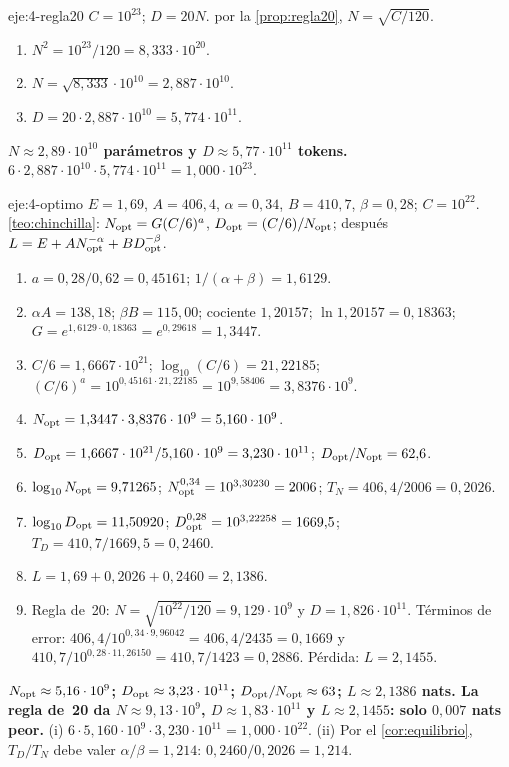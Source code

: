 \begin{solucion}{eje:4-regla20}
\datos $C=10^{23}$; $D=20N$.
\planteamiento por la \cref{prop:regla20}, $N=\sqrt{C/120}$.
\pasos
\begin{enumerate}[label=\arabic*.]
  \item $N^{2}=10^{23}/120=8{,}333\cdot 10^{20}$.
  \item $N=\sqrt{8{,}333}\cdot 10^{10}=2{,}887\cdot 10^{10}$.
  \item $D=20\cdot 2{,}887\cdot 10^{10}=5{,}774\cdot 10^{11}$.
\end{enumerate}
\resultado \textbf{$N\approx 2{,}89\cdot 10^{10}$ parámetros y $D\approx 5{,}77\cdot 10^{11}$ tokens.}
\comprobacion $6\cdot 2{,}887\cdot 10^{10}\cdot 5{,}774\cdot 10^{11}=1{,}000\cdot 10^{23}$.
\end{solucion}

\begin{solucion}{eje:4-optimo}
\datos $E=1{,}69$, $A=406{,}4$, $\alpha=0{,}34$, $B=410{,}7$, $\beta=0{,}28$; $C=10^{22}$.
\planteamiento \cref{teo:chinchilla}: $N_{\mathrm{opt}}=G(C/6)^{a}$, $D_{\mathrm{opt}}=(C/6)/N_{\mathrm{opt}}$; después $L=E+AN_{\mathrm{opt}}^{-\alpha}+BD_{\mathrm{opt}}^{-\beta}$.
\pasos
\begin{enumerate}[label=\arabic*.]
  \item $a=0{,}28/0{,}62=0{,}45161$; $1/(\alpha+\beta)=1{,}6129$.
  \item $\alpha A=138{,}18$; $\beta B=115{,}00$; cociente $1{,}20157$; $\ln 1{,}20157=0{,}18363$; $G=e^{1{,}6129\cdot 0{,}18363}=e^{0{,}29618}=1{,}3447$.
  \item $C/6=1{,}6667\cdot 10^{21}$; $\log_{10}(C/6)=21{,}22185$; $(C/6)^{a}=10^{0{,}45161\cdot 21{,}22185}=10^{9{,}58406}=3{,}8376\cdot 10^{9}$.
  \item $N_{\mathrm{opt}}=1{,}3447\cdot 3{,}8376\cdot 10^{9}=5{,}160\cdot 10^{9}$.
  \item $D_{\mathrm{opt}}=1{,}6667\cdot 10^{21}/5{,}160\cdot 10^{9}=3{,}230\cdot 10^{11}$; $D_{\mathrm{opt}}/N_{\mathrm{opt}}=62{,}6$.
  \item $\log_{10}N_{\mathrm{opt}}=9{,}71265$; $N_{\mathrm{opt}}^{0{,}34}=10^{3{,}30230}=2006$; $T_N=406{,}4/2006=0{,}2026$.
  \item $\log_{10}D_{\mathrm{opt}}=11{,}50920$; $D_{\mathrm{opt}}^{0{,}28}=10^{3{,}22258}=1669{,}5$; $T_D=410{,}7/1669{,}5=0{,}2460$.
  \item $L=1{,}69+0{,}2026+0{,}2460=2{,}1386$.
  \item Regla de~20: $N=\sqrt{10^{22}/120}=9{,}129\cdot 10^{9}$ y $D=1{,}826\cdot 10^{11}$. Términos de error: $406{,}4/10^{0{,}34\cdot 9{,}96042}=406{,}4/2435=0{,}1669$ y $410{,}7/10^{0{,}28\cdot 11{,}26150}=410{,}7/1423=0{,}2886$. Pérdida: $L=2{,}1455$.
\end{enumerate}
\resultado \textbf{$N_{\mathrm{opt}}\approx 5{,}16\cdot 10^{9}$; $D_{\mathrm{opt}}\approx 3{,}23\cdot 10^{11}$; $D_{\mathrm{opt}}/N_{\mathrm{opt}}\approx 63$; $L\approx 2{,}1386$ nats. La regla de~20 da $N\approx 9{,}13\cdot 10^{9}$, $D\approx 1{,}83\cdot 10^{11}$ y $L\approx 2{,}1455$: solo $0{,}007$ nats peor.}
\comprobacion (i) $6\cdot 5{,}160\cdot 10^{9}\cdot 3{,}230\cdot 10^{11}=1{,}000\cdot 10^{22}$. (ii) Por el \cref{cor:equilibrio}, $T_D/T_N$ debe valer $\alpha/\beta=1{,}214$: $0{,}2460/0{,}2026=1{,}214$.
\end{solucion}

